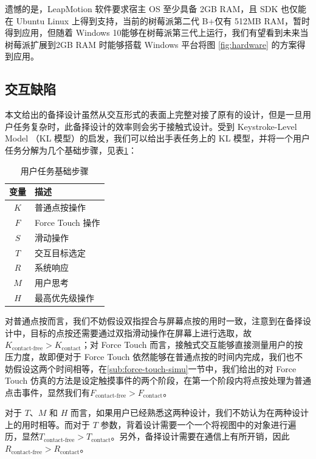 遗憾的是，LeapMotion 软件要求宿主 OS 至少具备 2GB RAM，且 SDK 也仅能在 Ubuntu Linux 上得到支持，当前的树莓派第二代 B+仅有 512MB RAM，暂时得到应用，但随着 Windows 10能够在树莓派第三代上运行，我们有望看到未来当树莓派扩展到2GB RAM 时能够搭载 Windows 平台将图 \ref{fig:hardware} 的方案得到应用。

\subsection{交互缺陷}

本文给出的备择设计虽然从交互形式的表面上完整对接了原有的设计，但是一旦用户任务复杂时，此备择设计的效率则会劣于接触式设计。受到 Keystroke-Level Model （KL 模型）的启发，我们可以给出手表任务上的 KL 模型，并将一个用户任务分解为几个基础步骤，见表\ref{table:task}：

\begin{table}[H]
    \small
    \kaishu
    \centering

    \begin{tabular}{c l}
        \toprule
        \textbf{变量}        & \textbf{描述} \\
        \hline
        $K$     & 普通点按操作 \\
        $F$     & Force Touch 操作 \\
        $S$     & 滑动操作 \\
        $T$     & 交互目标选定 \\
        $R$     & 系统响应 \\
        $M$     & 用户思考 \\
        $H$     & 最高优先级操作 \\
        \bottomrule
    \end{tabular}
    \caption{用户任务基础步骤}
    \label{table:task}
\end{table}

对普通点按而言，我们不妨假设双指捏合与屏幕点按的用时一致，注意到在备择设计中，目标的点按还需要通过双指滑动操作在屏幕上进行选取，故$K_{\text{contact-free}}>K_{\text{contact}}$；对 Force Touch 而言，接触式交互能够直接测量用户的按压力度，故即便对于 Force Touch 依然能够在普通点按的时间内完成，我们也不妨假设这两个时间相等，在\ref{sub:force-touch-simu}一节中，我们给出的对 Force Touch 仿真的方法是设定触摸事件的两个阶段，在第一个阶段内将点按处理为普通点击事件，显然我们有$F_{\text{contact-free}}>F_{\text{contact}}$。

对于 $T$、$M$ 和 $H$ 而言，如果用户已经熟悉这两种设计，我们不妨认为在两种设计上的用时相等。而对于 $T$ 参数，背着设计需要一个一个将视图中的对象进行遍历，显然$T_{\text{contact-free}}>T_{\text{contact}}$。另外，备择设计需要在通信上有所开销，因此$R_{\text{contact-free}}>R_{\text{contact}}$。


